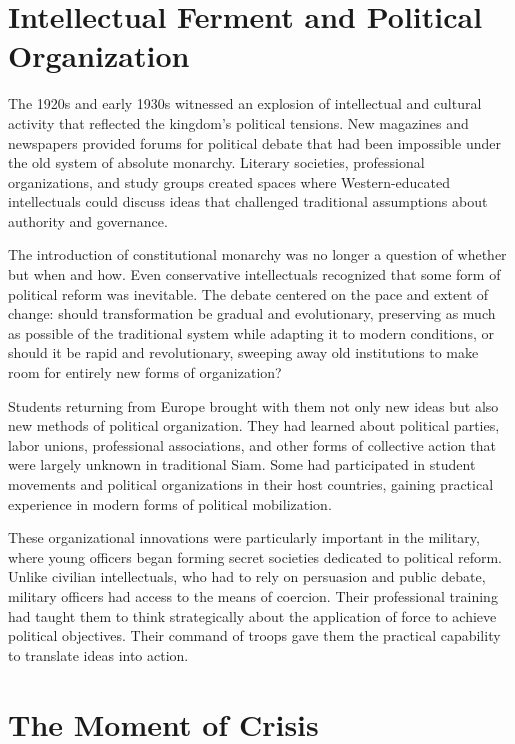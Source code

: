 \documentclass[
  Letterpaper,
]{scrbook}
\begin{document}
\section{Intellectual Ferment and Political
Organization}\label{intellectual-ferment-and-political-organization}

The 1920s and early 1930s witnessed an explosion of intellectual and
cultural activity that reflected the kingdom's political tensions. New
magazines and newspapers provided forums for political debate that had
been impossible under the old system of absolute monarchy. Literary
societies, professional organizations, and study groups created spaces
where Western-educated intellectuals could discuss ideas that challenged
traditional assumptions about authority and governance.

The introduction of constitutional monarchy was no longer a question of
whether but when and how. Even conservative intellectuals recognized
that some form of political reform was inevitable. The debate centered
on the pace and extent of change: should transformation be gradual and
evolutionary, preserving as much as possible of the traditional system
while adapting it to modern conditions, or should it be rapid and
revolutionary, sweeping away old institutions to make room for entirely
new forms of organization?

Students returning from Europe brought with them not only new ideas but
also new methods of political organization. They had learned about
political parties, labor unions, professional associations, and other
forms of collective action that were largely unknown in traditional
Siam. Some had participated in student movements and political
organizations in their host countries, gaining practical experience in
modern forms of political mobilization.

These organizational innovations were particularly important in the
military, where young officers began forming secret societies dedicated
to political reform. Unlike civilian intellectuals, who had to rely on
persuasion and public debate, military officers had access to the means
of coercion. Their professional training had taught them to think
strategically about the application of force to achieve political
objectives. Their command of troops gave them the practical capability
to translate ideas into action.

\section{The Moment of Crisis}\label{the-moment-of-crisis}
\end{document}
